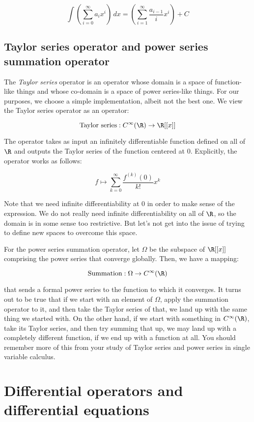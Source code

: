 \documentclass[10pt]{amsart}
\begin{document}
$$\int \left(\sum_{i=0}^\infty a_ix^i \right) \, dx = \left(\sum_{i=1}^\infty \frac{a_{i-1}}{i}x^i\right) + C$$

\subsection{Taylor series operator and power series summation operator}

The {\em Taylor series} operator is an operator whose domain is a
space of function-like things and whose co-domain is a space of power
series-like things. For our purposes, we choose a simple
implementation, albeit not the best one. We view the Taylor series operator as an operator:

$$\text{Taylor series}: C^\infty(\R) \to \R[[x]]$$

The operator takes as input an infinitely differentiable function
defined on all of $\R$ and outputs the Taylor series of the function
centered at $0$. Explicitly, the operator works as follows:

$$f \mapsto \sum_{k=0}^\infty \frac{f^{(k)}(0)}{k!}x^k$$

Note that we need infinite differentiability at $0$ in order to make
sense of the expression. We do not really need infinite
differentiability on all of $\R$, so the domain is in some sense too
restrictive. But let's not get into the issue of trying to define new
spaces to overcome this space.

For the power series summation operator, let $\Omega$ be the subspace
of $\R[[x]]$ comprising the power series that converge globally. Then, we have a mapping:

$$\text{Summation}: \Omega \to C^\infty(\R)$$

that sends a formal power series to the function to which it
converges. It turns out to be true that if we start with an element of
$\Omega$, apply the summation operator to it, and then take the Taylor
series of that, we land up with the same thing we started with. On the
other hand, if we start with something in $C^\infty(\R)$, take its
Taylor series, and then try summing that up, we may land up with a
completely different function, if we end up with a function at
all. You should remember more of this from your study of Taylor series
and power series in single variable calculus.

\section{Differential operators and differential equations}
\end{document}
